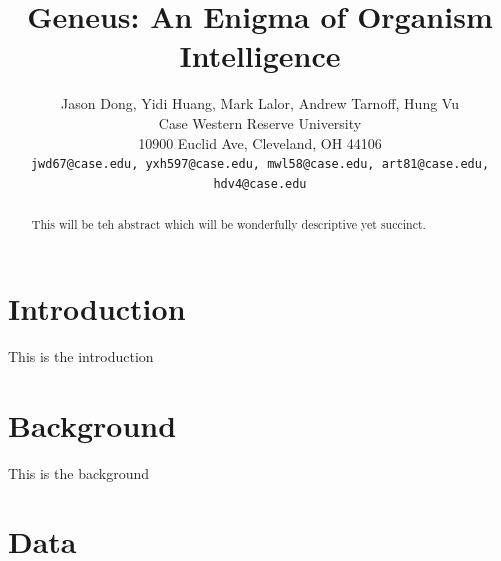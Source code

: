 \documentclass[10pt,twocolumn,letterpaper]{article}
\begin{document}
\title{Geneus: An Enigma of Organism Intelligence}

\author{Jason Dong, Yidi Huang, Mark Lalor, Andrew Tarnoff, Hung Vu \\
Case Western Reserve University\\
10900 Euclid Ave, Cleveland, OH 44106\\
{\tt\small jwd67@case.edu, yxh597@case.edu, mwl58@case.edu, art81@case.edu, hdv4@case.edu}}

\maketitle

\begin{abstract}
   This will be teh abstract which will be wonderfully descriptive yet succinct.
\end{abstract}

\section{Introduction}

This is the introduction \cite{Alpher02}

\section{Background}

This is the background \cite{Alpher04}

\section{Data}
\end{document}
